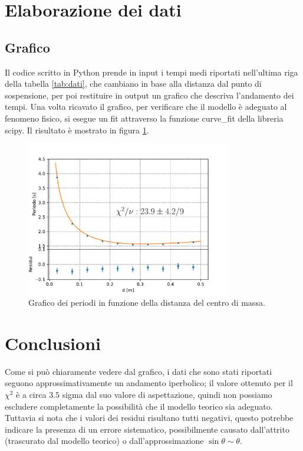 \documentclass[a4paper]{article}
\begin{document}
    
    \section{Elaborazione dei dati}
    
    \subsection{Grafico}
        Il codice scritto in Python prende in input i tempi medi riportati nell'ultima riga della tabella \ref{tab:dati}, che cambiano in base alla distanza dal punto di sospensione, per poi restituire in output un grafico che descriva l'andamento dei tempi. Una volta ricavato il grafico, per verificare che il modello è adeguato al fenomeno fisico, si esegue un fit
        attraverso la funzione curve\_fit della libreria scipy. Il risultato è mostrato in figura \ref{fig:Periodo_lunghezza}.
         \begin{figure}[ht!]
            \centering
            \includegraphics[width=0.8\textwidth]{extra/Periodo_lunghezza.pdf}
            \caption{Grafico dei periodi in funzione della distanza del centro di massa.}
            \label{fig:Periodo_lunghezza}
        \end{figure}
    

    
    \section{Conclusioni}
        Come si può chiaramente vedere dal grafico, i dati che sono stati riportati seguono approssimativamente un andamento iperbolico;
        il valore ottenuto per il $\chi^2$ è a circa $3.5$ sigma dal suo valore di aspettazione,
        quindi non possiamo escludere completamente la possibilità che il modello teorico
        sia adeguato.
        Tuttavia si nota che i valori dei residui risultano tutti negativi,
        questo potrebbe indicare la presenza di un errore sistematico,
        possibilmente causato dall'attrito (trascurato dal modello teorico) o dall'approssimazione $\sin \theta \sim \theta$.
        
\end{document}

